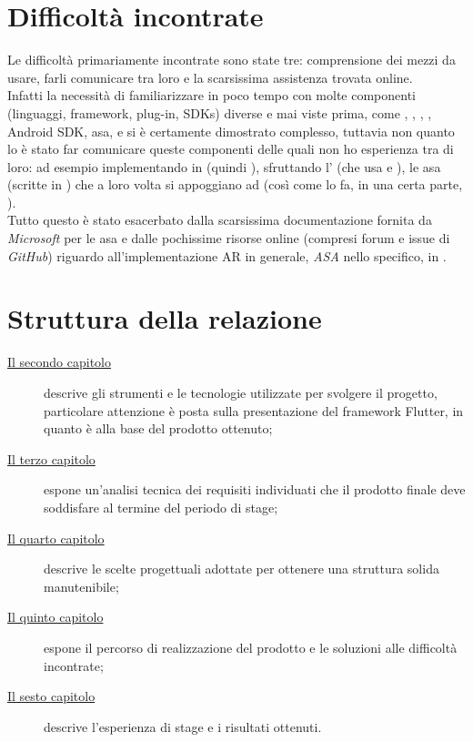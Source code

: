 \section{Difficoltà incontrate}
Le difficoltà primariamente incontrate sono state tre: comprensione dei mezzi da usare, farli comunicare tra loro e la scarsissima assistenza trovata online.\\
Infatti la necessità di familiarizzare in poco tempo con molte componenti (linguaggi, framework, plug-in, SDKs) diverse e mai viste prima, come \flutter, \kotlin, \java, \dart, Android SDK, asa, \arcore{} e \arplug{} si è certamente dimostrato complesso, tuttavia non quanto lo è stato far comunicare queste componenti delle quali non ho esperienza tra di loro: ad esempio implementando in \flutter{} (quindi \dart), sfruttando l'\arplug{} (che usa \kotlin{} e \flutter), le asa (scritte in \java) che a loro volta si appoggiano ad \arcore{} (così come lo fa, in una certa parte, \arplug). \\
Tutto questo è stato esacerbato dalla scarsissima documentazione fornita da \textit{Microsoft} per le asa e dalle pochissime risorse online (compresi forum e issue di \textit{GitHub}) riguardo all'implementazione AR in generale, \textit{ASA} nello specifico, in \flutter.
\section{Struttura della relazione}
\todo
\iffalse
\begin{description}
    \item[{\hyperref[cap:strumenti-utilizzati]{Il secondo capitolo}}] descrive gli strumenti e le tecnologie utilizzate per svolgere il progetto, particolare attenzione è posta sulla presentazione del framework Flutter, in quanto è alla base del prodotto ottenuto;
    
    \item[{\hyperref[cap:analisi-requisiti]{Il terzo capitolo}}] espone un'analisi tecnica dei requisiti individuati che il prodotto finale deve soddisfare al termine del periodo di stage;
    
    \item[{\hyperref[cap:progettazione]{Il quarto capitolo}}] descrive le scelte progettuali adottate per ottenere una struttura solida manutenibile;
    
    \item[{\hyperref[cap:sviluppo]{Il quinto capitolo}}] espone il percorso di realizzazione del prodotto e le soluzioni alle difficoltà incontrate;
    
    \item[{\hyperref[cap:conclusioni]{Il sesto capitolo}}] descrive l'esperienza di stage e i risultati ottenuti.
\end{description}

